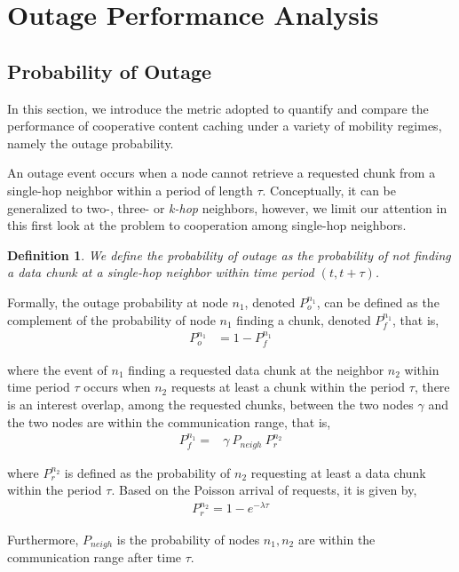 \documentclass[conference,a4paper]{IEEEtran}
\newtheorem*{theorem:outage}{Definition}
\begin{document}
\section{Outage Performance Analysis \label{sec:outage}}
\subsection{Probability of Outage}
In this section, we introduce the metric adopted to quantify and compare the performance of cooperative content caching under a variety of mobility regimes, namely the outage probability.

An outage event occurs when a node cannot retrieve a requested chunk from a single-hop neighbor within a period of length $\tau$. Conceptually, it can be generalized to two-, three- or {\it k-hop} neighbors, however, we limit our attention in this first look at the problem to cooperation among single-hop neighbors.

\begin{theorem:outage}
We define the probability of outage as the probability of not finding a data chunk at a single-hop neighbor within time period $(t, t+\tau)$.
\end{theorem:outage}

Formally, the outage probability at node $n_1$, denoted $P_o^{n_1}$, can be defined as the complement of the probability of node $n_1$ finding a chunk, denoted $P_f^{n_1}$, that is,
\begin{align*}
P_o^{n_1} &= 1 - P_f^{n_1}
\end{align*}

\noindent where the event of $n_1$ finding a requested data chunk at the neighbor $n_2$ within time period $\tau$ occurs when $n_2$ requests at least a chunk within the period $\tau$, there is an interest overlap, among the requested chunks, between the two nodes $\gamma$ and the two nodes are within the communication range, that is,
\begin{align}
P_f^{n_1} = & \gamma ~ P_{neigh} ~ P_r^{n_2} \label{eqn:finding}
\end{align}

\noindent where $P_r^{n_2}$ is defined as the probability of $n_2$ requesting at least a data chunk within the period $\tau$. Based on the Poisson arrival of requests, it is given by,
\begin{align*}
P_r^{n_2} = 1 - e^{-\lambda \tau}
\end{align*}

Furthermore, $P_{neigh}$ is the probability of nodes $n_1, n_2$ are within the communication range after time $\tau$.
\end{document}
